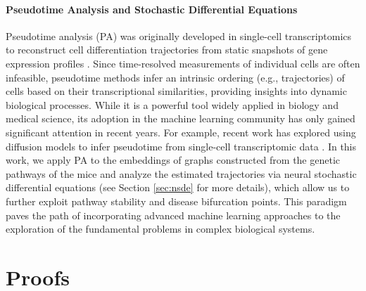 \documentclass{article} %
\begin{document}
\paragraph{Pseudotime Analysis and Stochastic Differential Equations}
Pseudotime analysis (PA) was originally developed in single-cell transcriptomics to reconstruct cell differentiation trajectories from static snapshots of gene expression profiles \citep{trapnell2014dynamics,haghverdi2016diffusion,wei2021dtflow}. Since time-resolved measurements of individual cells are often infeasible, pseudotime methods infer an intrinsic ordering (e.g., trajectories) of cells based on their transcriptional similarities, providing insights into dynamic biological processes. While it is a powerful tool widely applied in biology and medical science, its adoption in the machine learning community has only gained significant attention in recent years. For example, recent work has explored using diffusion models to infer pseudotime from single-cell transcriptomic data \citep{mosspseudotime}. In this work, we apply PA to the embeddings of graphs constructed from the genetic pathways of the mice and analyze the estimated trajectories via neural stochastic differential equations \citep{li2020scalable} (see Section \ref{sec:nsde} for more details), which allow us to further exploit pathway stability and disease bifurcation points. This paradigm paves the path of incorporating advanced machine learning approaches to the exploration of the fundamental problems in complex biological systems.

















\section{Proofs}\label{append:proof}
\end{document}
